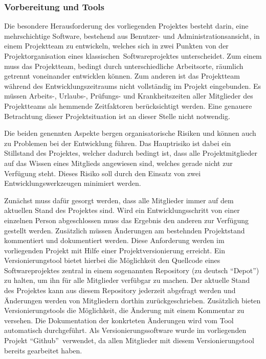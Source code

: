 \subsubsection{Vorbereitung und Tools}
\label{sec:VorbereitungUndTools}

Die besondere Herausforderung des vorliegenden Projektes besteht darin, eine
mehrschichtige Software, bestehend aus Benutzer- und Administrationsansicht, in
einem Projektteam zu entwickeln, welches sich in zwei Punkten von der
Projektorganisation eines klassischen\footnotemark\ Softwareprojektes
unterscheidet. Zum einem muss das Projektteam, bedingt durch unterschiedliche
Arbeitsorte, räumlich getrennt voneinander entwicklen können. Zum anderen
ist das Projektteam während des Entwicklungszeitraums nicht vollständig im
Projekt eingebunden. Es müssen Arbeits-, Urlaubs-, Prüfungs- und
Krankheitszeiten aller Mitglieder des Projektteams als hemmende Zeitfaktoren
berücksichtigt werden. Eine genauere Betrachtung dieser Projektsituation ist an
dieser Stelle nicht notwendig.


Die beiden genennten Aspekte bergen organisatorische Risiken und können auch zu
Problemen bei der Entwicklung führen. Das Hauptrisiko ist dabei ein Stillstand
des Projektes, welcher dadurch bedingt ist, dass alle Projektmitglieder auf das
Wissen eines Mitglieds angewiesen sind, welches gerade nicht zur Verfügung
steht. Dieses Risiko soll durch den Einsatz von zwei Entwicklungswerkzeugen
minimiert werden.

Zunächst muss dafür gesorgt werden, dass alle Mitglieder immer auf dem
aktuellen Stand des Projektes sind. Wird ein Entwicklungsschritt von einer
einzelnen Person abgeschlossen muss das Ergebnis den anderen zur Verfügung
gestellt werden. Zusätzlich müssen Änderungen am bestehnden Projektstand
kommentiert und dokumentiert werden. Diese Anforderung werden im vorliegenden
Projekt mit Hilfe einer Projektversionierung erreicht. Ein Versionierungstool
bietet hierbei die Möglichkeit den Quellcode eines Softwareprojektes zentral in
einem sogenannten Repository (zu deutsch "`Depot"') zu halten, um ihn für alle
Mitglieder verfübgar zu machen. Der aktuelle Stand des Projektes kann aus
diesem Repository jederzeit abgefragt werden und Änderungen werden von
Mitgliedern dorthin zurückgeschrieben. Zusätzlich bieten Versionierungstools die
Möglichkeit, die Änderung mit einem Kommentar zu versehen. Die Dokumentation der
konkrteten Änderungen wird vom Tool automatisch durchgeführt. Als
Versionierungssoftware wurde im vorliegenden Projekt "`Github"'\footnotemark\
verwendet, da allen Mitglieder mit diesem Versionierungstool bereits gearbeitet
haben.

